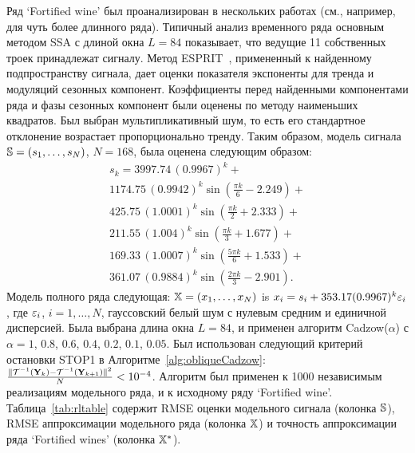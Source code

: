 \documentclass[12pt, specialist, subf,href,colorlinks=true,substylefile = spbu.rtx]{disser}
\theoremstyle{remark}
\theoremstyle{definition}
\begin{document}
Ряд `Fortified wine' был проанализирован в нескольких работах (см., например, \cite{Golyandina.etal2015} для чуть более длинного ряда).
Типичный анализ временного ряда основным методом SSA с длиной окна $L=84$ показывает, что ведущие 11 собственных троек
принадлежат сигналу. Метод ESPRIT~\cite{Roy.Kailath1989,Golyandina.Zhigljavsky2012}, примененный к найденному подпространству сигнала, дает оценки показателя экспоненты для тренда и модуляций сезонных компонент. Коэффициенты перед найденными компонентами ряда и фазы сезонных компонент были оценены по методу наименьших квадратов. Был выбран мультипликативный шум, то есть его стандартное отклонение возрастает пропорционально тренду.
Таким образом, модель сигнала $\mathbb{S} = (s_{1}, \ldots, s_N)$, $N=168$, была оценена следующим образом:
%
%
\begin{multline*}
s_{k} = 3997.74\, (0.9967)^k + \\
1174.75\, (0.9942)^k \sin(\frac{\pi k}{6} - 2.249) + \\
425.75\, (1.0001)^k \sin(\frac{\pi k}{2} + 2.333) + \\
211.55\, (1.004)^k \sin(\frac{\pi k}{3} + 1.677) + \\
169.33\, (1.0007)^k \sin(\frac{5 \pi k}{6} + 1.533) + \\
361.07\, (0.9884)^k \sin(\frac{2 \pi k}{3} - 2.901).
\end{multline*}
Модель полного ряда следующая: $\mathbb{X}=(x_1,\ldots,x_N)$ is $x_i=s_i + 353.17 (0.9967)^k \varepsilon_i$,
где  $\varepsilon_i$, $i=1,\ldots,N$,  гауссовский белый шум с нулевым средним и единичной дисперсией.
Была выбрана длина окна $L=84$, и применен алгоритм Cadzow($\alpha$) с $\alpha=1$, $0.8$, $0.6$, $0.4$, $0.2$, $0.1$, $0.05$.
Был использован следующий критерий остановки STOP1 в Алгоритме~\ref{alg:obliqueCadzow}:
$\frac{\|\mathcal{T}^{-1}(\mathbf{Y}_k) - \mathcal{T}^{-1}(\mathbf{Y}_{k + 1})\|^2}{N} <10^{-4}$.
Алгоритм был применен к 1000 независимым реализациям модельного ряда, и к исходному ряду `Fortified wine'.
Таблица~\ref{tab:rltable} содержит RMSE оценки модельного сигнала (колонка $\mathbb{S}$),
RMSE аппроксимации модельного ряда (колонка $\mathbb{X}$) и точность аппроксимации ряда
`Fortified wines' (колонка $\mathbb{X}^*$).
\end{document}
